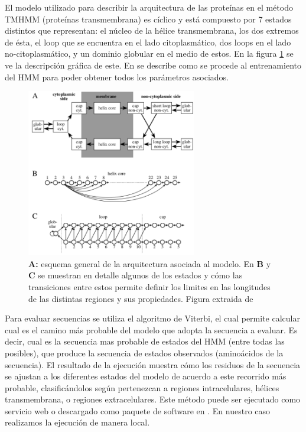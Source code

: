 El modelo utilizado para describir la arquitectura de las proteínas en el método TMHMM (proteínas transmembrana) es cíclico y está compuesto por 7 estados distintos que representan: el núcleo de la hélice transmembrana, 
los dos extremos de ésta, el loop que se encuentra en el lado citoplasmático, dos loops en el lado no-citoplasmático, y un dominio globular en el medio de estos.
En la figura \ref{tmhmmModel} se ve la descripción gráfica de este.
En \cite{sonnhammer1998hidden} se describe como se procede al entrenamiento del HMM para poder obtener todos los parámetros asociados.


\begin{figure}[h!,centered]
\centering
\includegraphics[width=0.66\textwidth]{img/tmhmmModel.png} 
\caption{\textbf{A:} esquema general de la arquitectura asociada al modelo. En \textbf{B} y \textbf{C} se muestran en detalle algunos de los estados y cómo las
transiciones entre estos permite definir los limites en las longitudes de las distintas regiones y sus propiedades. Figura extraida de \cite{sonnhammer1998hidden}}
\label{tmhmmModel}
\end{figure}


Para evaluar secuencias se utiliza el algoritmo de Viterbi, el cual permite calcular cual es el camino más probable del modelo que adopta la secuencia a evaluar. Es decir, cual es la secuencia mas probable de estados del HMM 
(entre todas las posibles), que produce la secuencia de estados observados (aminoácidos de la secuencia).
El resultado de la ejecución muestra cómo los residuos de la secuencia se ajustan a los diferentes estados del modelo de acuerdo a este recorrido más probable, clasificándolos según pertenezcan a regiones intracelulares, hélices transmembrana, 
o regiones extracelulares. 
Este método puede ser ejecutado como servicio web o descargado como paquete de software en \cite{tmhmmServer}.
En nuestro caso realizamos la ejecución de manera local.

